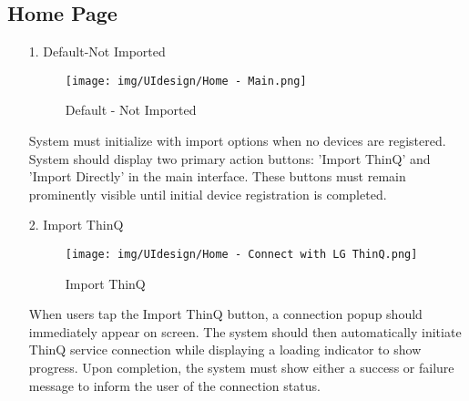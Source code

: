 \documentclass[conference]{IEEEtran}
\begin{document}
\begin{enumerate}
\begin{itemize}
\begin{itemize}
\begin{enumerate}
    
    

\subsection{Home Page}

\begin{enumerate}
    \item[1.] Default-Not Imported
    \begin{figure}[h]
        {\centering
        \hspace{4cm}
        \begin{minipage}{0.4\columnwidth}
            \texttt{[image: img/UIdesign/Home - Main.png]}
            \caption{Default - Not Imported}
        \end{minipage}}
    \end{figure}
    
    System must initialize with import options when no devices are registered. System should display two primary action buttons: 'Import ThinQ' and 'Import Directly' in the main interface. These buttons must remain prominently visible until initial device registration is completed. \\ 
\end{enumerate}

\begin{enumerate}
    \item[2.] Import ThinQ
    \begin{figure}[h]
        {\centering
        \hspace{4cm}
        \begin{minipage}{0.4\columnwidth}
            \texttt{[image: img/UIdesign/Home - Connect with LG ThinQ.png]}
            \caption{Import ThinQ}
        \end{minipage}}
    \end{figure}
    
    When users tap the Import ThinQ button, a connection popup should immediately appear on screen. The system should then automatically initiate ThinQ service connection while displaying a loading indicator to show progress. Upon completion, the system must show either a success or failure message to inform the user of the connection status. \\ \\ \\ \\ \\ \\ \\ \\ \\ \\ \\ \\ \\ \\ \\ \\
\end{enumerate}


\end{enumerate}
\end{itemize}
\end{itemize}
\end{enumerate}
\end{document}
